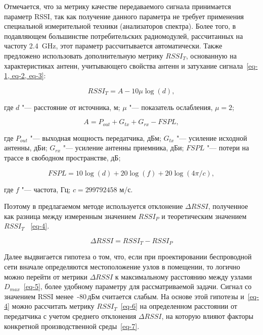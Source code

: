 Отмечается, что за метрику качестве передаваемого сигнала принимается параметр RSSI, так как получение данного параметра не требует применения специальной измерительной техники (анализаторов спектра). Более того, в подавляющем большинстве потребительских радиомодулей, рассчитанных на частоту \SI{2,4}{\giga\hertz}, этот параметр рассчитывается автоматически. Также предложено использовать дополнительную метрику $RSSI_T$, основанную на характеристиках антенн, учитывающего свойства антенн и затухание сигнала~\cref{eq-1, eq-2, eq-3}:

\begin{equation}
RSSI_T = A-10 \mu\log (d),
\label{eq-1}
\end{equation}

\noindent где $d$ "--- расстояние от источника, м; $\mu$ "--- показатель ослабления, $\mu = 2$;

\begin{equation}
A = P_{out} + G_{tx} + G_{rx} -FSPL,
\label{eq-2}
\end{equation}

\noindent где $P_{out}$ "--- выходная мощность передатчика, дБм; $G_{tx}$ "--- усиление исходной антенны, дБи; $G_{rx}$ "--- усиление антенны приемника, дБи; $FSPL$ "--- потери на трассе в свободном пространстве, дБ;

\begin{equation}
FSPL = 10 \log (d) +20 \log (f) +20 \log (4 \pi/c),
\label{eq-3}
\end{equation}

\noindent где $f$ "--- частота, Гц; $c = 299792458$ м/с.

Поэтому в предлагаемом методе используется отклонение $\Delta RSSI$, полученное как разница между измеренным значением $RSSI_P$ и теоретическим значением $RSSI_T$~ \cref{eq-4}.

\begin{equation}
\Delta RSSI = RSSI_T-RSSI_P
\label{eq-4}
\end{equation}

Далее выдвигается гипотеза о том, что, если при проектировании беспроводной сети вначале определяются местоположение узлов в помещении, то логично можно перейти от метрики $\Delta RSSI$ к максимальному расстоянию между узлами~$D_{max}$~\cref{eq-5}, более удобному параметру для рассматриваемой задачи. Сигнал со значением RSSI менее~-80\,дБм считается слабым. На основе этой гипотезы и~\cref{eq-4} можно рассчитать метрику $RSSI_T$~\cref{eq-6} на определенном расстоянии от передатчика с учетом среднего отклонения $\Delta RSSI$, на которую влияют факторы конкретной производственной среды~\cref{eq-7}.

